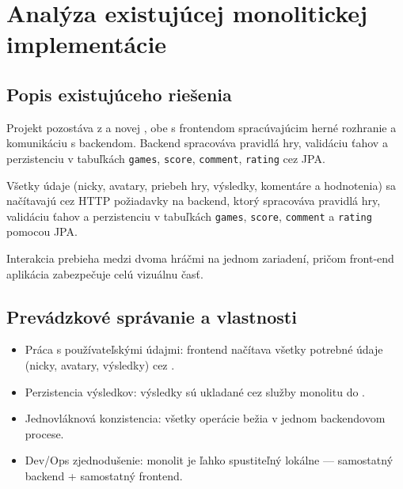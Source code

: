 \section{Analýza existujúcej monolitickej implementácie}
\subsection{Popis existujúceho riešenia}
Projekt pozostáva z  a novej , obe s frontendom spracúvajúcim herné rozhranie a komunikáciu s backendom. Backend spracováva pravidlá hry, validáciu ťahov a perzistenciu v  tabuľkách \texttt{games}, \texttt{score}, \texttt{comment}, \texttt{rating} cez JPA.

Všetky údaje (nicky, avatary, priebeh hry, výsledky, komentáre a hodnotenia) sa načítavajú cez HTTP požiadavky na backend, ktorý spracováva pravidlá hry, validáciu ťahov a perzistenciu v  tabuľkách \texttt{games}, \texttt{score}, \texttt{comment} a \texttt{rating} pomocou JPA.

Interakcia prebieha medzi dvoma hráčmi na jednom zariadení, pričom front-end  aplikácia zabezpečuje celú vizuálnu časť.

\subsection{Prevádzkové správanie a vlastnosti}
\begin{itemize}
    \item Práca s používateľskými údajmi: frontend načítava všetky potrebné údaje (nicky, avatary, výsledky) cez . 
    \item Perzistencia výsledkov: výsledky sú ukladané cez služby monolitu do .
    \item Jednovláknová konzistencia: všetky operácie bežia v jednom backendovom procese.
    \item Dev/Ops zjednodušenie: monolit je ľahko spustiteľný lokálne — samostatný backend + samostatný frontend.
\end{itemize}

